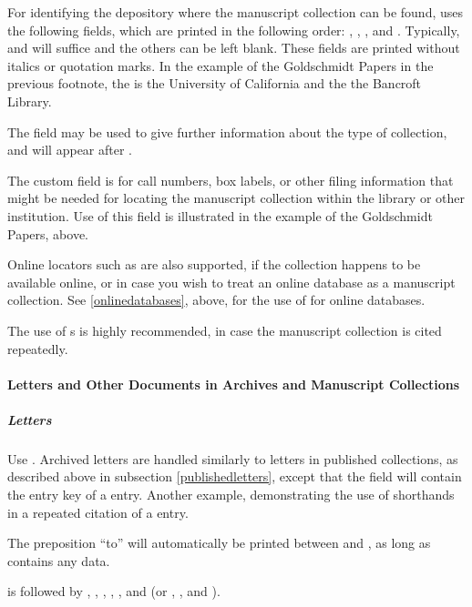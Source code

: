 \documentclass{ltxdockit}[2010/02/12]
\begin{document}
For identifying the depository where the manuscript collection can be found,  uses the following fields, which are printed in the following order: , , , and . Typically,  and  will suffice and the others can be left blank. These fields are printed without italics or quotation marks. In the example of the Goldschmidt Papers in the previous footnote, the  is the University of California and the  the Bancroft Library.

The field  may be used to give further information about the type of collection, and will appear after .\autocites[][]{1980}

The custom field  is for call numbers, box labels, or other filing information that might be needed for locating the manuscript collection within the library or other institution. Use of this field is illustrated in the example of the Goldschmidt Papers, above.


Online locators such as  are also supported, if the collection happens to be available online, or in case you wish to treat an online database as a manuscript collection.\autocites[][]{1976} See \ref{onlinedatabases}, above, for the use of  for online databases.

The use of s is highly recommended, in case the manuscript collection is cited repeatedly.\autocites[][]{1904}

\paragraph{Letters and Other Documents in Archives and Manuscript Collections}
\subparagraph{Letters}\label{archivedletters}
Use . Archived letters are handled similarly to letters in published collections, as described above in subsection \ref{publishedletters}, except that the  field will contain the entry key of a  entry.\autocites{1607}
Another example, demonstrating the use of shorthands in a repeated citation of a  entry.\autocites[][]{1911}

The preposition ``to'' will automatically be printed between  and , as long as  contains any data. 

 is followed by , , , , , and (or , , and ). 
\end{document}
